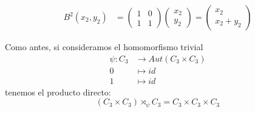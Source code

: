 \documentclass[a4paper, 11pt]{article}
\begin{document}
\begin{solucion}
\begin{align*}
        B^2(x_2,y_2) &= \left(
            \begin{array}{cc}
                1 & 0 \\
                1 & 1
            \end{array}
            \right) \left(
            \begin{array}{c}
                x_2 \\
                y_2
            \end{array}
            \right) = \left(
            \begin{array}{c}
                x_2 \\
                x_2+y_2
            \end{array}
            \right)
    \end{align*}

    Como antes, si consideramos el homomorfismo trivial
    \begin{align*}
        \psi : C_3 &\longrightarrow Aut(C_3 \times C_3) \\
        0 &\longmapsto id \\
        1 &\longmapsto id
    \end{align*}
    tenemos el producto directo:
    \[
    (C_3 \times C_3) \rtimes_{\psi} C_3 = C_3 \times C_3 \times C_3
    \]
  \end{solucion}
\end{document}
